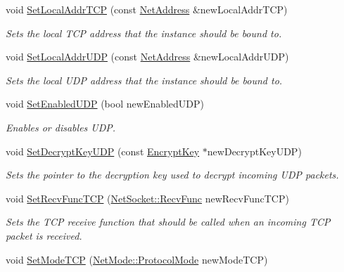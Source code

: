 \begin{DoxyCompactItemize}
void \hyperlink{class_net_instance_profile_ad3f5d1c25fb1dce3b1c2f692d4e2a0fa}{SetLocalAddrTCP} (const \hyperlink{class_net_address}{NetAddress} \&newLocalAddrTCP)
\begin{DoxyCompactList}\small\item\em Sets the local TCP address that the instance should be bound to. \item\end{DoxyCompactList}\item 
void \hyperlink{class_net_instance_profile_a8299e23979c397f8d75a71212ba240c9}{SetLocalAddrUDP} (const \hyperlink{class_net_address}{NetAddress} \&newLocalAddrUDP)
\begin{DoxyCompactList}\small\item\em Sets the local UDP address that the instance should be bound to. \item\end{DoxyCompactList}\item 
void \hyperlink{class_net_instance_profile_a902105c1a8743cce62e3df9c9a022700}{SetEnabledUDP} (bool newEnabledUDP)
\begin{DoxyCompactList}\small\item\em Enables or disables UDP. \item\end{DoxyCompactList}\item 
void \hyperlink{class_net_instance_profile_a73cc53b7890131ee645288ef5ec728ff}{SetDecryptKeyUDP} (const \hyperlink{class_encrypt_key}{EncryptKey} $\ast$newDecryptKeyUDP)
\begin{DoxyCompactList}\small\item\em Sets the pointer to the decryption key used to decrypt incoming UDP packets. \item\end{DoxyCompactList}\item 
void \hyperlink{class_net_instance_profile_ae962a48359066ff383f459dad140d1b2}{SetRecvFuncTCP} (\hyperlink{class_net_socket_a52b5f4de8d0a47fd8620f542b21c076c}{NetSocket::RecvFunc} newRecvFuncTCP)
\begin{DoxyCompactList}\small\item\em Sets the TCP receive function that should be called when an incoming TCP packet is received. \item\end{DoxyCompactList}\item 
void \hyperlink{class_net_instance_profile_a8fb33cbbfb7f5caf9eb8545c38775eeb}{SetModeTCP} (\hyperlink{class_net_mode_a43cfa55ee6a4db66a8d7d6c27f766964}{NetMode::ProtocolMode} newModeTCP)

\end{DoxyCompactItemize}
